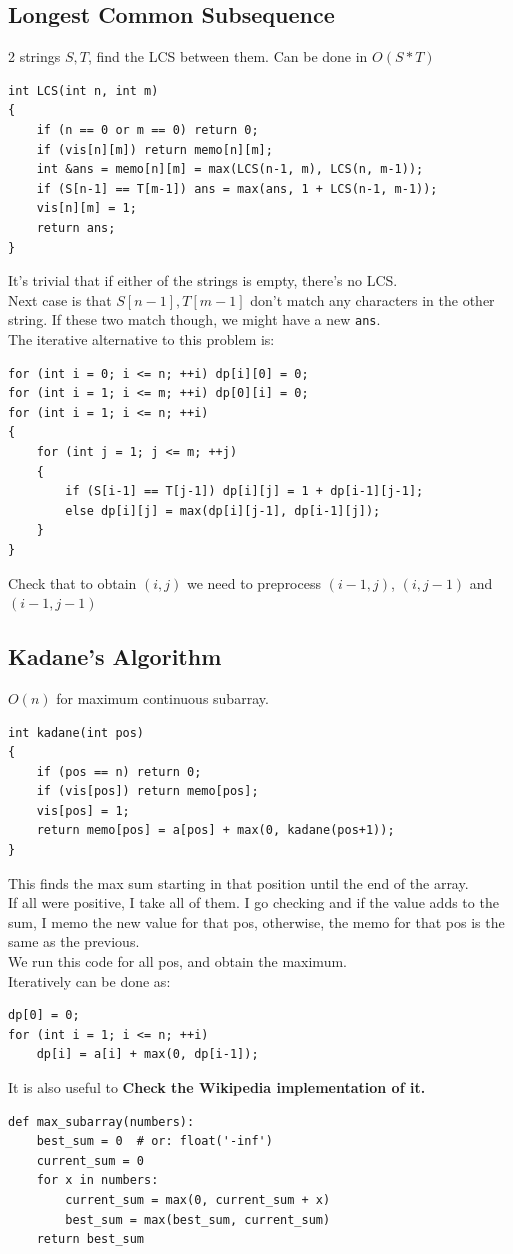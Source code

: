 \documentclass{IEEEtran}
\begin{document}
        \subsection{Longest Common Subsequence}
            2 strings $S,T$, find the LCS between them. Can be done in $O(S*T)$
            \begin{lstlisting}
int LCS(int n, int m) 
{
    if (n == 0 or m == 0) return 0;
    if (vis[n][m]) return memo[n][m];
    int &ans = memo[n][m] = max(LCS(n-1, m), LCS(n, m-1));
    if (S[n-1] == T[m-1]) ans = max(ans, 1 + LCS(n-1, m-1));
    vis[n][m] = 1;
    return ans;
}
            \end{lstlisting}
            It's trivial that if either of the strings is empty, there's no LCS.\\
            Next case is that $S[n-1],T[m-1]$ don't match any characters in the other string. If these two match though, we might have a new \texttt{ans}.\\
            The iterative alternative to this problem is:
            \begin{lstlisting}
for (int i = 0; i <= n; ++i) dp[i][0] = 0;
for (int i = 1; i <= m; ++i) dp[0][i] = 0;
for (int i = 1; i <= n; ++i) 
{
    for (int j = 1; j <= m; ++j) 
    {
		if (S[i-1] == T[j-1]) dp[i][j] = 1 + dp[i-1][j-1];
		else dp[i][j] = max(dp[i][j-1], dp[i-1][j]);
	}
}
            \end{lstlisting}
            Check that to obtain $(i,j)$ we need to preprocess $(i-1,j)$, $(i,j-1)$ and $(i-1,j-1)$
        \subsection{Kadane's Algorithm}
            $O(n)$ for maximum continuous subarray. 
            \begin{lstlisting}
int kadane(int pos) 
{
	if (pos == n) return 0;
	if (vis[pos]) return memo[pos];
	vis[pos] = 1;
  	return memo[pos] = a[pos] + max(0, kadane(pos+1));
}
            \end{lstlisting}    
            This finds the max sum starting in that position until the end of the array.\\
            If all were positive, I take all of them. I go checking and if the value adds to the sum, I memo the new value for that pos, otherwise, the memo for that pos is the same as the previous.\\
            We run this code for all pos, and obtain the maximum.\\
            Iteratively can be done as:
            \begin{lstlisting}
dp[0] = 0;
for (int i = 1; i <= n; ++i)
	dp[i] = a[i] + max(0, dp[i-1]);
            \end{lstlisting}
            It is also useful to \textbf{Check the Wikipedia implementation of it.}
            \begin{lstlisting}
def max_subarray(numbers):
    best_sum = 0  # or: float('-inf')
    current_sum = 0
    for x in numbers:
        current_sum = max(0, current_sum + x)
        best_sum = max(best_sum, current_sum)
    return best_sum
            \end{lstlisting}
\end{document}

